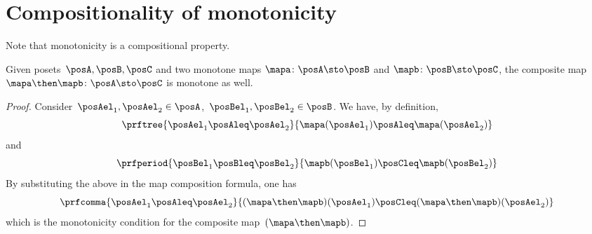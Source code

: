 
\section{Compositionality of monotonicity}
Note that monotonicity is a compositional property.
\begin{lemma}
	Given posets~$\posA,\posB,\posC$ and two monotone maps $\mapa\colon \posA \sto \posB$ and $\mapb\colon \posB \sto \posC$, the composite map $\mapa\then \mapb\colon \posA \sto \posC$ is monotone as well.
\end{lemma}
\begin{proof}
	Consider~$\posAel_1,\posAel_2 \in \posA$,~$\posBel_1,\posBel_2\in \posB$.
	We have, by definition,
	\begin{equation*}
		\prftree{\posAel_1\posAleq \posAel_2}{\mapa(\posAel_1)\posAleq \mapa(\posAel_2)}
	\end{equation*}
	and
	\begin{equation*}
		\prfperiod{\posBel_1\posBleq \posBel_2}{\mapb(\posBel_1)\posCleq \mapb(\posBel_2)}
	\end{equation*}
	By substituting the above in the map composition formula, one has
	\begin{equation}
		\prfcomma{\posAel_1\posAleq \posAel_2 }{ (\mapa\then \mapb)(\posAel_1) \posCleq (\mapa\then \mapb)(\posAel_2)}
	\end{equation}
	which is the monotonicity condition for the composite map~$(\mapa\then \mapb)$.
\end{proof}
